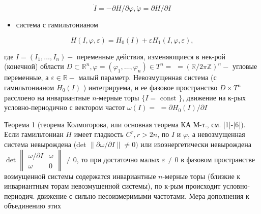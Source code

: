 \documentclass[10pt]{article}
\begin{document}
\[

\dot{I}=-\partial H / \partial \varphi, \dot{\varphi}=\partial H / \partial I

\]



\begin{itemize}

  \item система с гамильтонианом

\end{itemize}



\[

H(I, \varphi, \varepsilon)=H_{0}(I)+\varepsilon H_{1}(I, \varphi, \varepsilon),

\]



где $I=\left(I_{1}, \ldots, I_{n}\right)-$ переменные действия, изменяющиеся в нек-рой (конечной) области $D \subset \mathbb{R}^{n}, \varphi=\left(\varphi_{1}, \ldots, \varphi_{n}\right) \in T^{n}=$ $=(\mathbb{R} / 2 \pi \mathbb{Z})^{n}-$ угловые переменные, а $\varepsilon \in \mathbb{R}-$ малый параметр. Невозмущенная система (с гамильтонианом $H_{0}(I)$ ) интегрируема, и ее фазовое пространство $D \times T^{n}$ расслоено на инвариантные $n$-мерные торы $\{I=$ const $\}$, движение на к-рых условно-периодично с вектором частот $\omega(I)=$ $=\partial H_{0}(I) / \partial I$



Теорема 1 (теорема Колмогорова, или основная теорема КА М-т., см. [1]-[6]). Если гамильтониан $H$ имеет гладкость $C^{r}, r>2 n$, по $I$ и $\varphi$, а невозмущенная система невырождена (det $\|\partial \omega / \partial I\| \neq 0)$ или изоэнергетически невырождена $\operatorname{det}\left\|\begin{array}{cc}\omega / \partial I & \omega \\ \omega & 0\end{array}\right\| \neq 0$, то при достаточно малых $\varepsilon \neq 0$ в фазовом пространстве возмущенной системы содержатся инвариантные $n$-мерные торы (близкие к инвариантным торам невозмущенной системы), по к-рым происходит условно-периодич. движение с сильно несоизмеримыми частотами. Мера дополнения к объединению этих
\end{document}
